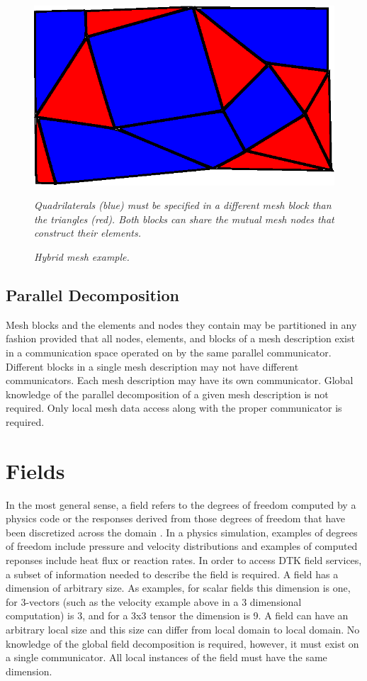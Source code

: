 \documentclass[letterpaper,12pt]{article}
\begin{document}
\begin{figure}[htpb!]
  \centering
  \includegraphics[width=5in]{hybrid_mesh.eps}
  \caption{\sl Hybrid mesh example.} {\sl Quadrilaterals (blue) must
    be specified in a different mesh block than the triangles
    (red). Both blocks can share the mutual mesh nodes that construct
    their elements.}
  \label{fig:hybrid_mesh}
\end{figure}

\subsection{Parallel Decomposition}\label{subsec:mesh_decomp}
Mesh blocks and the elements and nodes they contain may be partitioned
in any fashion provided that all nodes, elements, and blocks of a mesh
description exist in a communication space operated on by the same
parallel communicator. Different blocks in a single mesh description
may not have different communicators. Each mesh description may have
its own communicator. Global knowledge of the parallel decomposition
of a given mesh description is not required. Only local mesh data
access along with the proper communicator is required.

\clearpage

\section{Fields}\label{sec:field}
In the most general sense, a field refers to the degrees of freedom
computed by a physics code or the responses derived from those degrees
of freedom that have been discretized across the domain
\cite{LIME_2011}. In a physics simulation, examples of degrees of
freedom include pressure and velocity distributions and examples of
computed reponses include heat flux or reaction rates. In order to
access DTK field services, a subset of information needed to describe
the field is required. A field has a dimension of arbitrary size. As
examples, for scalar fields this dimension is one, for 3-vectors (such
as the velocity example above in a 3 dimensional computation) is 3,
and for a 3x3 tensor the dimension is 9. A field can have an arbitrary
local size and this size can differ from local domain to local
domain. No knowledge of the global field decomposition is required,
however, it must exist on a single communicator. All local instances
of the field must have the same dimension.
\end{document}
